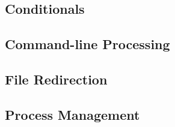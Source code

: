 \entry{35mm}{}{}\\
\entry{35mm}{}{}\\
\entry{35mm}{}{}\\




\subsection*{Conditionals}





\subsection*{Command-line Processing}





\subsection*{File Redirection}





\subsection*{Process Management}




\subsection*{}


